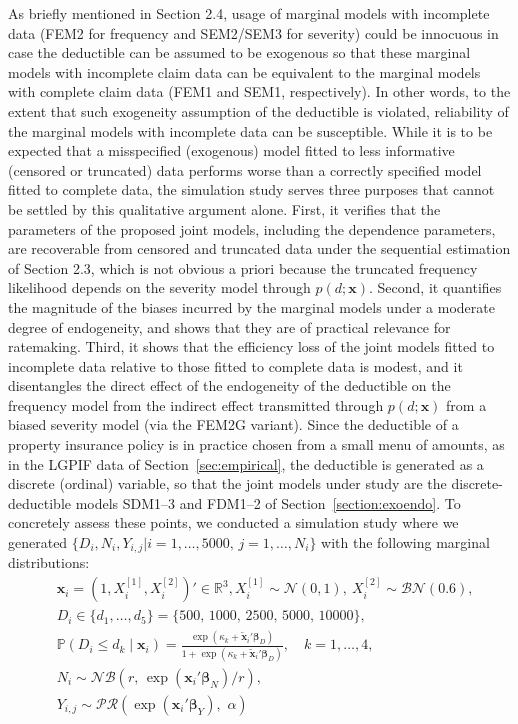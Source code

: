 \documentclass[11pt]{article}
\newcommand{\rev}[1]{{\color{blue}#1}}
\begin{document}
As briefly mentioned in Section 2.4, usage of marginal models with incomplete data (FEM2 for frequency and SEM2/SEM3 for severity) could be innocuous in case the deductible can be assumed to be exogenous so that these marginal models with incomplete claim data can be equivalent to the marginal models with complete claim data (FEM1 and SEM1, respectively). In other words, to the extent that such exogeneity assumption of the deductible is violated, reliability of the marginal models with incomplete data can be susceptible. \rev{While it is to be expected that a misspecified (exogenous) model fitted to less informative (censored or truncated) data performs worse than a correctly specified model fitted to complete data, the simulation study serves three purposes that cannot be settled by this qualitative argument alone. First, it verifies that the parameters of the proposed joint models, including the dependence parameters, are recoverable from censored and truncated data under the sequential estimation of Section 2.3, which is not obvious a priori because the truncated frequency likelihood depends on the severity model through $p(d;\bm{x})$. Second, it quantifies the magnitude of the biases incurred by the marginal models under a moderate degree of endogeneity, and shows that they are of practical relevance for ratemaking. Third, it shows that the efficiency loss of the joint models fitted to incomplete data relative to those fitted to complete data is modest, and it disentangles the direct effect of the endogeneity of the deductible on the frequency model from the indirect effect transmitted through $p(d;\bm{x})$ from a biased severity model (via the FEM2G variant).} \rev{Since the deductible of a property insurance policy is in practice chosen from a small menu of amounts, as in the LGPIF data of Section~\ref{sec:empirical}, the deductible is generated as a discrete (ordinal) variable, so that the joint models under study are the discrete-deductible models SDM1--3 and FDM1--2 of Section~\ref{section:exoendo}.} To concretely assess \rev{these points}, we conducted a simulation study where we generated $\{D_i, N_{i},Y_{i,j} |i=1,\ldots, 5000, \, j=1,\ldots, N_i \}$ with the following marginal distributions:
{\color{blue}
$$
\begin{aligned}
& \bm{x}_i = (1, X^{[1]}_{i}, X^{[2]}_{i})' \in \mathbb{R}^{3}, X^{[1]}_{i} \sim \mathcal{N}(0, 1), \ X^{[2]}_{i} \sim \mathcal{BN}(0.6), \\
& D_i \in \{d_1,\ldots,d_5\}=\{500,\, 1000,\, 2500,\, 5000,\, 10000\}, \\
&\mathbb{P}(D_i \le d_k \mid \bm{x}_i) = \frac{\exp(\kappa_k + \tilde{\bm{x}}_i'\bm{\beta}_D)}{1+\exp(\kappa_k + \tilde{\bm{x}}_i'\bm{\beta}_D)}, \quad k=1,\ldots,4, \\
&N_{i} \sim \mathcal{NB}(r,\,\exp(\bm{x}_i'\bm{\beta}_N)/ r), \\
&Y_{i,j} \sim \mathcal{PR}(\exp(\bm{x}_i'\bm{\beta}_Y), \, \,\alpha)
\end{aligned}
$$
}
\end{document}
